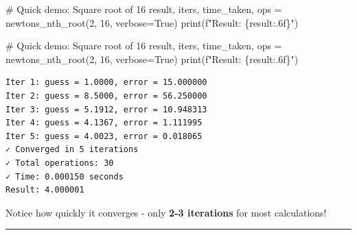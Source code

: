 \documentclass[
  letterpaper,
  DIV=11,
  numbers=noendperiod]{scrartcl}
\newenvironment{Shaded}{\begin{snugshade}}{\end{snugshade}}
\newcommand{\BuiltInTok}[1]{\textcolor[rgb]{0.00,0.23,0.31}{#1}}
\newcommand{\CommentTok}[1]{\textcolor[rgb]{0.37,0.37,0.37}{#1}}
\newcommand{\DecValTok}[1]{\textcolor[rgb]{0.68,0.00,0.00}{#1}}
\newcommand{\NormalTok}[1]{\textcolor[rgb]{0.00,0.23,0.31}{#1}}
\newcommand{\OperatorTok}[1]{\textcolor[rgb]{0.37,0.37,0.37}{#1}}
\newcommand{\SpecialCharTok}[1]{\textcolor[rgb]{0.37,0.37,0.37}{#1}}
\newcommand{\SpecialStringTok}[1]{\textcolor[rgb]{0.13,0.47,0.30}{#1}}
\newcommand{\VariableTok}[1]{\textcolor[rgb]{0.07,0.07,0.07}{#1}}
\begin{document}
\begin{Shaded}
\begin{Highlighting}[]
\CommentTok{\# Quick demo: Square root of 16}
\NormalTok{result, iters, time\_taken, ops }\OperatorTok{=}\NormalTok{ newtons\_nth\_root(}\DecValTok{2}\NormalTok{, }\DecValTok{16}\NormalTok{, verbose}\OperatorTok{=}\VariableTok{True}\NormalTok{)}
\BuiltInTok{print}\NormalTok{(}\SpecialStringTok{f"Result: }\SpecialCharTok{\{}\NormalTok{result}\SpecialCharTok{:.6f\}}\SpecialStringTok{"}\NormalTok{)}
\end{Highlighting}
\end{Shaded}

\begin{Shaded}
\begin{Highlighting}[]
\CommentTok{\# Quick demo: Square root of 16}
\NormalTok{result, iters, time\_taken, ops }\OperatorTok{=}\NormalTok{ newtons\_nth\_root(}\DecValTok{2}\NormalTok{, }\DecValTok{16}\NormalTok{, verbose}\OperatorTok{=}\VariableTok{True}\NormalTok{)}
\BuiltInTok{print}\NormalTok{(}\SpecialStringTok{f"Result: }\SpecialCharTok{\{}\NormalTok{result}\SpecialCharTok{:.6f\}}\SpecialStringTok{"}\NormalTok{)}
\end{Highlighting}
\end{Shaded}

\begin{verbatim}
Iter 1: guess = 1.0000, error = 15.000000
Iter 2: guess = 8.5000, error = 56.250000
Iter 3: guess = 5.1912, error = 10.948313
Iter 4: guess = 4.1367, error = 1.111995
Iter 5: guess = 4.0023, error = 0.018065
✓ Converged in 5 iterations
✓ Total operations: 30
✓ Time: 0.000150 seconds
Result: 4.000001
\end{verbatim}

\begin{tcolorbox}[enhanced jigsaw, breakable, colbacktitle=quarto-callout-tip-color!10!white, toprule=.15mm, bottomtitle=1mm, left=2mm, title=\textcolor{quarto-callout-tip-color}{\faLightbulb}\hspace{0.5em}{Key Observation}, leftrule=.75mm, opacitybacktitle=0.6, bottomrule=.15mm, colframe=quarto-callout-tip-color-frame, opacityback=0, coltitle=black, toptitle=1mm, arc=.35mm, titlerule=0mm, rightrule=.15mm, colback=white]

Notice how quickly it converges - only {\textbf{2-3 iterations}} for
most calculations!

\end{tcolorbox}

\begin{center}\rule{0.5\linewidth}{0.5pt}\end{center}
\end{document}
